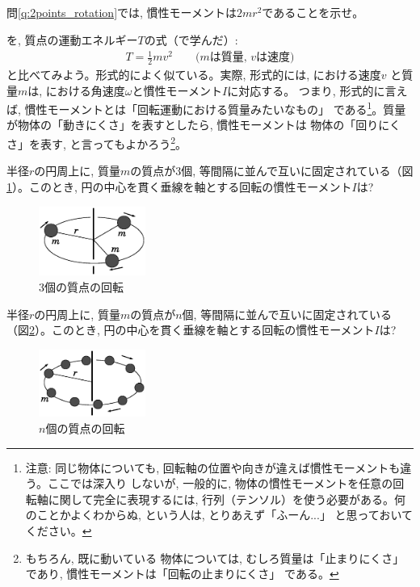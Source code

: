 %
\begin{q}\label{q:mominert_2points_rotation}
問\ref{q:2points_rotation}では, 慣性モーメントは$2mr^2$であることを示せ。
\end{q}
\mv

を, 質点の運動エネルギー$T$の式（で学んだ）:
\begin{eqnarray}
T=\frac{1}{2}mv^2\quad\quad\text{($m$は質量, $v$は速度)}\label{eq:kineticEnergy9}
\end{eqnarray}
と比べてみよう。形式的によく似ている。実際, 形式的には, における速度$v$
と質量$m$は, における角速度$\omega$と慣性モーメント$I$に対応する。
つまり, 形式的に言えば, 慣性モーメントとは「回転運動における質量みたいなもの」
である\footnote{注意: 同じ物体についても, 回転軸の位置や向きが違えば慣性モーメントも違う。ここでは深入り
しないが, 一般的に, 物体の慣性モーメントを任意の回転軸に関して完全に表現するには, 
行列（テンソル）を使う必要がある。何のことかよくわからぬ, という人は, とりあえず「ふーん...」
と思っておいてください。}。質量が物体の「動きにくさ」を表すとしたら, 慣性モーメントは
物体の「回りにくさ」を表す, と言ってもよかろう\footnote{もちろん, 既に動いている
物体については, むしろ質量は「止まりにくさ」であり, 慣性モーメントは「回転の止まりにくさ」
である。}。\mv

%
\begin{q}\label{q:mominert_3points}
半径$r$の円周上に, 質量$m$の質点が3個, 等間隔に並んで互いに固定されている（図\ref{fig:disk1}）。このとき, 
円の中心を貫く垂線を軸とする回転の慣性モーメント$I$は?
\begin{figure}[h]
    \centering
    \includegraphics[width=3.5cm]{disk1.eps}
    \caption{3個の質点の回転}\label{fig:disk1}
\end{figure}
\end{q}

%
\begin{q}\label{q:mominert_npoints}
半径$r$の円周上に, 質量$m$の質点が$n$個, 等間隔に並んで互いに固定されている（図\ref{fig:disk2}）。このとき, 
円の中心を貫く垂線を軸とする回転の慣性モーメント$I$は?
\begin{figure}[h]
    \centering
    \includegraphics[width=3.5cm]{disk2.eps}
    \caption{$n$個の質点の回転}\label{fig:disk2}
\end{figure}
\end{q}
\vspace{0.2cm}

